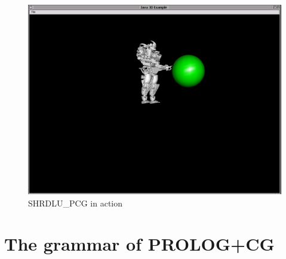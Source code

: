\documentclass{book}
\begin{document}
\begin{htmlonly}

\begin{figure}
\begin{center}
\includegraphics{Image2.png}
\end{center}
\caption{\label{Fig:SHRDLU:CanvasClass}SHRDLU\_PCG in action}
\end{figure}

\end{htmlonly}




\appendix

\chapter{The grammar of PROLOG+CG}\label{AppendixGrammar}
\end{document}
